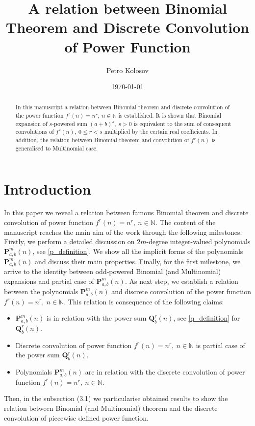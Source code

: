 \documentclass[12pt, letterpaper]{amsart}
\title{A relation between Binomial Theorem and Discrete Convolution of Power Function}
\author[Petro Kolosov]{Petro Kolosov}
\date{\today}
\theoremstyle{definition}
\theoremstyle{remark}
\numberwithin{equation}{section}
\begin{document}
\begin{abstract}
In this manuscript a relation between Binomial theorem and discrete convolution of the power function $f^r(n)=n^r, \ n\in\mathbb{N}$ is established. It is shown that Binomial expansion of $s$-powered sum $(a+b)^s, \ s>0$ is equivalent to the sum of consequent convolutions of $f^r(n), \ 0\leq r < s$ multiplied by the certain real coefficients. In addition, the relation between Binomial theorem and convolution of $f^r(n)$ is generalised to Multinomial case.
\end{abstract}
\maketitle
\tableofcontents
\section{Introduction}
In this paper we reveal a relation between famous Binomial theorem \cite{AbraSteg72} and discrete convolution of power function $f^r(n)=n^r, \ n\in\mathbb{N}$. The content of the manuscript reaches the main aim of the work through the following milestones. Firstly, we perform a detailed discussion on $2m$-degree integer-valued polynomials $\mathbf{P}^{m}_{a,b}(n)$, see \eqref{p_definition}. We show all the implicit forms of the polynomials $\mathbf{P}^{m}_{a,b}(n)$ and discuss their main properties. Finally, for the first milestone, we arrive to the identity between odd-powered Binomial (and Multinomial) expansions and partial case of $\mathbf{P}^{m}_{a,b}(n)$. As next step, we establish a relation between the polynomials $\mathbf{P}^{m}_{a,b}(n)$ and discrete convolution of the power function $f^r(n)=n^r, \ n\in\mathbb{N}$. This relation is consequence of the following claims:
\begin{itemize}
  \item $\mathbf{P}^{m}_{a,b}(n)$ is in relation with the power sum $\mathbf{Q}^{r}_{b}(n)$, see \eqref{q_definition} for $\mathbf{Q}^{r}_{b}(n)$.
  \item Discrete convolution of power function $f^r(n)=n^r, \ n\in\mathbb{N}$ is partial case of the power sum $\mathbf{Q}^{r}_{b}(n)$.
  \item Polynomials $\mathbf{P}^{m}_{a,b}(n)$ are in relation with the discrete convolution of power function $f^r(n)=n^r, \ n\in\mathbb{N}$.
\end{itemize}
Then, in the subsection (3.1) we particularise obtained results to show the relation between Binomial (and Multinomial) theorem and the discrete convolution of piecewise defined power function.
\end{document}
